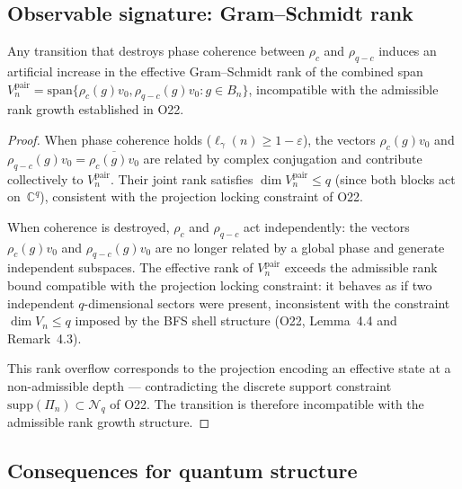 \subsection{Observable signature: Gram--Schmidt rank}
  \label{subsec:q1-corollary}

  \begin{corollary}
    \label{cor:gram-schmidt-rank}
    Any transition that destroys phase coherence between $\rho_c$ and
    $\rho_{q-c}$ induces an artificial increase in the effective
    Gram--Schmidt rank of the combined span
    $V_n^{\mathrm{pair}} = \mathrm{span}\{\rho_c(g) v_0, \rho_{q-c}(g) v_0
    : g \in B_n\}$,
    incompatible with the admissible rank growth established in O22.
  \end{corollary}

  \begin{proof}
    When phase coherence holds ($\ell_\gamma(n) \geq 1 - \varepsilon$), the vectors
    $\rho_c(g) v_0$ and $\rho_{q-c}(g) v_0 = \overline{\rho_c(g) v_0}$
    are related by complex conjugation and contribute collectively to
    $V_n^{\mathrm{pair}}$.
    Their joint rank satisfies $\dim V_n^{\mathrm{pair}} \leq q$ (since both
    blocks act on~$\mathbb{C}^q$), consistent with the projection locking
    constraint of O22.

    When coherence is destroyed, $\rho_c$ and $\rho_{q-c}$ act independently:
    the vectors $\rho_c(g) v_0$ and $\rho_{q-c}(g) v_0$ are no longer related
    by a global phase and generate independent subspaces.
    The effective rank of $V_n^{\mathrm{pair}}$ exceeds the admissible rank
    bound compatible with the projection locking constraint: it behaves as if
    two independent $q$-dimensional sectors were present, inconsistent with
    the constraint $\dim V_n \leq q$ imposed by the BFS shell structure
    (O22, Lemma~4.4 and Remark~4.3).

    This rank overflow corresponds to the projection encoding an effective state
    at a non-admissible depth — contradicting the discrete support constraint
    $\mathrm{supp}(\Pi_n) \subset \mathcal{N}_q$ of O22.
    The transition is therefore incompatible with the admissible rank growth
    structure.
  \end{proof}

\subsection{Consequences for quantum structure}
  \label{subsec:q1-consequences}

